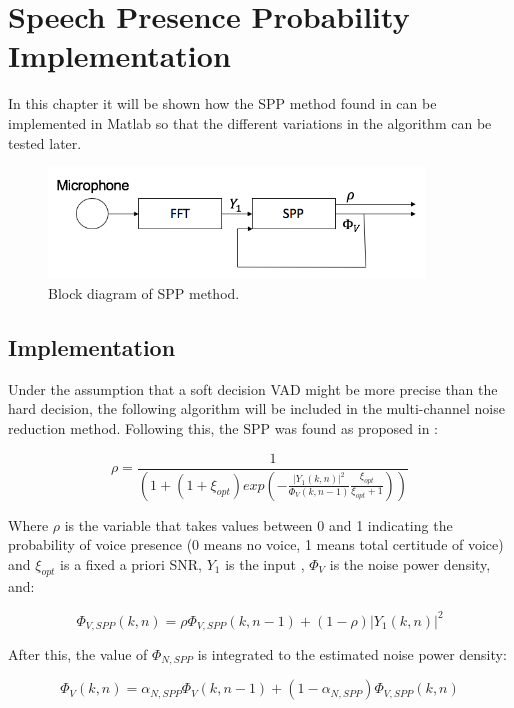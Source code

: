 \chapter{Speech Presence Probability Implementation}

In this chapter it will be shown how the SPP method found in \cite{Gerkmann2011NoisePresence} can be implemented in Matlab so that the different variations in the algorithm can be tested later.

\begin{figure}[!ht]
  \centering
	\includegraphics[width=100mm]{Kap3/SPPdiag}
	\caption{Block diagram of SPP method.}
	\label{fig:SPPdiag}
\end{figure}

\section{Implementation}

Under the assumption that a soft decision VAD might be more precise than the hard decision, the following algorithm will be included in the  multi-channel noise reduction method.  Following this, the SPP was found as proposed in \cite{Gerkmann2011NoisePresence}: 

\begin{equation}\label{SPP}
{\rho=\frac{1}{\left( 1+(1+\xi_{opt})exp\left(-\frac{|Y_1(k,n)|^2}{\Phi_{V}(k,n-1)}\frac{\xi_{opt}}{\xi_{opt}+1}\right)\right)}}
\end{equation}


Where $\rho$ is the variable that takes values between 0 and 1 indicating the probability of voice presence (0 means no voice, 1 means total certitude of voice) and  $\xi_{opt}$ is a fixed a priori SNR, $Y_1$ is the input , $\Phi_V$ is the noise power density, and:

\begin{equation}
\Phi_{V,SPP}(k,n)=\rho \Phi_{V,SPP}(k,n-1)+(1-\rho)|Y_1(k,n)|^2
\label{psdNoi}
\end{equation}


After this, the value of $\Phi_{N,SPP}$ is integrated to the estimated noise power density:

\begin{equation}
\Phi_{V}(k,n)=\alpha_{N,SPP} \Phi_{V}(k,n-1)+(1-\alpha_{N,SPP})\Phi_{V,SPP}(k,n)
\label{noipsdc}
\end{equation}


